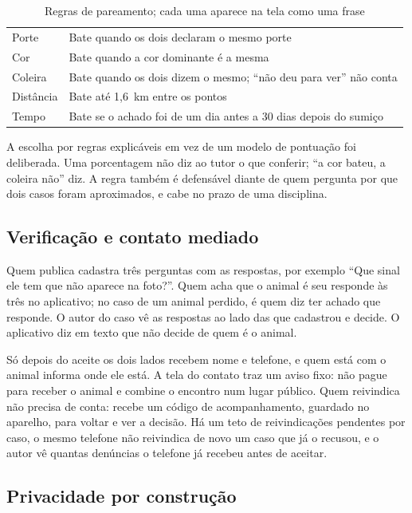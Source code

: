 \documentclass[12pt]{article}
\begin{document}
\begin{table}[ht]
\centering
\caption{Regras de pareamento; cada uma aparece na tela como uma frase}
\label{tab:pareamento}
\begin{tabularx}{\textwidth}{lX}
\toprule
Porte & Bate quando os dois declaram o mesmo porte \\
Cor & Bate quando a cor dominante é a mesma \\
Coleira & Bate quando os dois dizem o mesmo; ``não deu para ver'' não conta \\
Distância & Bate até 1,6~km entre os pontos \\
Tempo & Bate se o achado foi de um dia antes a 30 dias depois do sumiço \\
\bottomrule
\end{tabularx}
\end{table}

A escolha por regras explicáveis em vez de um modelo de pontuação foi deliberada.
Uma porcentagem não diz ao tutor o que conferir; ``a cor bateu, a coleira não''
diz. A regra também é defensável diante de quem pergunta por que dois casos foram
aproximados, e cabe no prazo de uma disciplina.

\subsection{Verificação e contato mediado}

Quem publica cadastra três perguntas com as respostas, por exemplo ``Que sinal
ele tem que não aparece na foto?''. Quem acha que o animal é seu responde às três
no aplicativo; no caso de um animal perdido, é quem diz ter achado que responde. O
autor do caso vê as respostas ao lado das que cadastrou e decide. O aplicativo
diz em texto que não decide de quem é o animal.

Só depois do aceite os dois lados recebem nome e telefone, e quem está com o
animal informa onde ele está. A tela do contato traz um aviso fixo: não pague para
receber o animal e combine o encontro num lugar público. Quem reivindica não
precisa de conta: recebe um código de acompanhamento, guardado no aparelho, para
voltar e ver a decisão. Há um teto de reivindicações pendentes por caso, o mesmo
telefone não reivindica de novo um caso que já o recusou, e o autor vê quantas
denúncias o telefone já recebeu antes de aceitar.

\subsection{Privacidade por construção}
\label{sec:privacidade}
\end{document}
